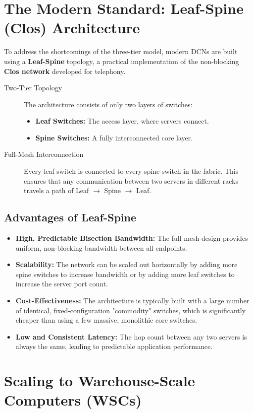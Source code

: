 \section{The Modern Standard: Leaf-Spine (Clos) Architecture}
To address the shortcomings of the three-tier model, modern DCNs are built using a \textbf{Leaf-Spine} topology, a practical implementation of the non-blocking \textbf{Clos network} developed for telephony.
\begin{description}
    \item[Two-Tier Topology] The architecture consists of only two layers of switches:
    \begin{itemize}
        \item \textbf{Leaf Switches:} The access layer, where servers connect.
        \item \textbf{Spine Switches:} A fully interconnected core layer.
    \end{itemize}
    \item[Full-Mesh Interconnection] Every leaf switch is connected to every spine switch in the fabric. This ensures that any communication between two servers in different racks travels a path of Leaf $\rightarrow$ Spine $\rightarrow$ Leaf.
\end{description}
\subsection{Advantages of Leaf-Spine}
\begin{itemize}
    \item \textbf{High, Predictable Bisection Bandwidth:} The full-mesh design provides uniform, non-blocking bandwidth between all endpoints.
    \item \textbf{Scalability:} The network can be scaled out horizontally by adding more spine switches to increase bandwidth or by adding more leaf switches to increase the server port count.
    \item \textbf{Cost-Effectiveness:} The architecture is typically built with a large number of identical, fixed-configuration "commodity" switches, which is significantly cheaper than using a few massive, monolithic core switches.
    \item \textbf{Low and Consistent Latency:} The hop count between any two servers is always the same, leading to predictable application performance.
\end{itemize}

\section{Scaling to Warehouse-Scale Computers (WSCs)}
